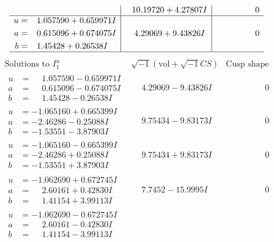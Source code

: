 \documentclass[1p]{elsarticle_modified}
\theoremstyle{definition}
\newcommand{\I}{\sqrt{-1}}
\begin{document}
$$\begin{array}{c|c|c}
 & \phantom{-}10.19720 + 4.27807 I & \phantom{-0.000000 } 0 \\ \hline\begin{aligned}
u &= \phantom{-}1.057590 + 0.659971 I \\
a &= \phantom{-}0.615096 + 0.674075 I \\
b &= \phantom{-}1.45428 + 0.26538 I\end{aligned}
 & \phantom{-}4.29069 + 9.43826 I & \phantom{-0.000000 } 0\\
 \hline 
 \end{array}$$\newpage$$\begin{array}{c|c|c}  
\text{Solutions to }I^u_{1}& \I (\text{vol} + \sqrt{-1}CS) & \text{Cusp shape}\\
 \hline 
\begin{aligned}
u &= \phantom{-}1.057590 - 0.659971 I \\
a &= \phantom{-}0.615096 - 0.674075 I \\
b &= \phantom{-}1.45428 - 0.26538 I\end{aligned}
 & \phantom{-}4.29069 - 9.43826 I & \phantom{-0.000000 } 0 \\ \hline\begin{aligned}
u &= -1.065160 + 0.665399 I \\
a &= -2.46286 - 0.25088 I \\
b &= -1.53551 - 3.87903 I\end{aligned}
 & \phantom{-}9.75434 - 9.83173 I & \phantom{-0.000000 } 0 \\ \hline\begin{aligned}
u &= -1.065160 - 0.665399 I \\
a &= -2.46286 + 0.25088 I \\
b &= -1.53551 + 3.87903 I\end{aligned}
 & \phantom{-}9.75434 + 9.83173 I & \phantom{-0.000000 } 0 \\ \hline\begin{aligned}
u &= -1.062690 + 0.672745 I \\
a &= \phantom{-}2.60161 + 0.42830 I \\
b &= \phantom{-}1.41154 + 3.99113 I\end{aligned}
 & \phantom{-}7.7452 - 15.9995 I & \phantom{-0.000000 } 0 \\ \hline\begin{aligned}
u &= -1.062690 - 0.672745 I \\
a &= \phantom{-}2.60161 - 0.42830 I \\
b &= \phantom{-}1.41154 - 3.99113 I\end{aligned}

\end{array}$$
\end{document}
